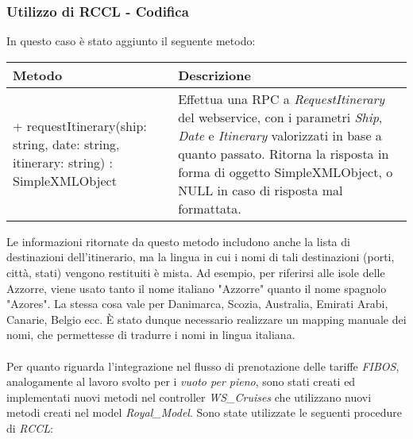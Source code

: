 \subsubsection{Utilizzo di RCCL - Codifica}
In questo caso è stato aggiunto il seguente metodo: 
\begin{center}
	\def\arraystretch{1.5}
	\begin{longtable}{ >{\raggedright}p{5.5cm} p{6.8cm}} 
		\hline
		\textbf{Metodo} & \textbf{Descrizione} \\
		\hline
		+ requestItinerary(ship: string, date: string, itinerary: string) : SimpleXMLObject & Effettua una \gls{RPC} a \textit{RequestItinerary} del \gls{webservice}, con i parametri \textit{Ship}, \textit{Date} e \textit{Itinerary} valorizzati in base a quanto passato. Ritorna la risposta in forma di oggetto SimpleXMLObject, o NULL in caso di risposta mal formattata.\\
		\hline
	\end{longtable}
\end{center}
Le informazioni ritornate da questo metodo includono anche la lista di destinazioni dell'itinerario, ma la lingua in cui i nomi di tali destinazioni (porti, città, stati) vengono restituiti è mista. Ad esempio, per riferirsi alle isole delle Azzorre, viene usato tanto il nome italiano "Azzorre" quanto il nome spagnolo "Azores". La stessa cosa vale per Danimarca, Scozia, Australia, Emirati Arabi, Canarie, Belgio ecc. È stato dunque necessario realizzare un mapping manuale dei nomi, che permettesse di tradurre i nomi in lingua italiana.\\ \\
Per quanto riguarda l'integrazione nel flusso di prenotazione delle tariffe \textit{FIBOS}, analogamente al lavoro svolto per i \textit{vuoto per pieno}, sono stati creati ed implementati nuovi metodi nel controller \textit{WS\_Cruises} che utilizzano nuovi metodi creati nel model \textit{Royal\_Model}. Sono state utilizzate le seguenti procedure di \textit{RCCL}:

